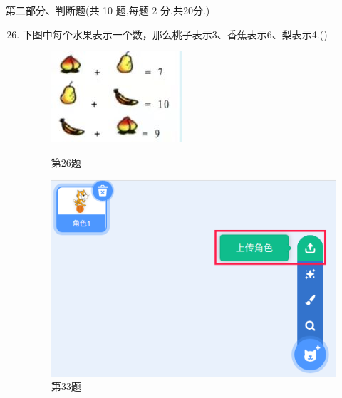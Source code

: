 \documentclass[10pt, a4paper]{article}
\begin{document}
    \newpage
    {\noindent\heiti 第二部分、判断题(共 10 题,每题 2 分,共20分.)}
    \begin{enumerate}
        \setcounter{enumi}{25}
        \item 下图中每个水果表示一个数，那么桃子表示3、香蕉表示6、梨表示4.(\qquad)
        
        \begin{figure}[h!]
            \centering
            \begin{minipage}[t]{.18\textwidth}
                \centering
                \includegraphics[width=\textwidth]{26.jpg}
                \caption*{第26题}
            \end{minipage}
            \begin{minipage}[t]{.18\textwidth}
                \centering
                \includegraphics[width=\textwidth]{33.png}
                \caption*{第33题}
            \end{minipage}
        \end{figure}


\end{enumerate}
\end{document}

